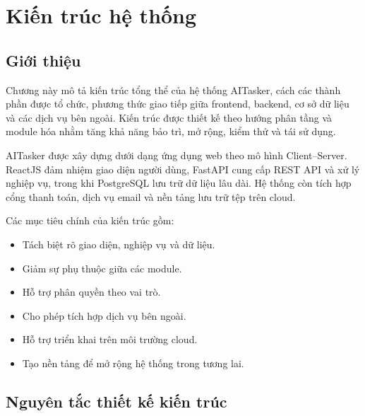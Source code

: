 %
%

\chapter{Kiến trúc hệ thống}
\label{chap:system-architecture}

\section{Giới thiệu}
\label{sec:architecture-introduction}

Chương này mô tả kiến trúc tổng thể của hệ thống AITasker, cách các thành phần được tổ chức, phương thức giao tiếp giữa frontend, backend, cơ sở dữ liệu và các dịch vụ bên ngoài. Kiến trúc được thiết kế theo hướng phân tầng và module hóa nhằm tăng khả năng bảo trì, mở rộng, kiểm thử và tái sử dụng.

AITasker được xây dựng dưới dạng ứng dụng web theo mô hình Client--Server. ReactJS đảm nhiệm giao diện người dùng, FastAPI cung cấp REST API và xử lý nghiệp vụ, trong khi PostgreSQL lưu trữ dữ liệu lâu dài. Hệ thống còn tích hợp cổng thanh toán, dịch vụ email và nền tảng lưu trữ tệp trên cloud.

Các mục tiêu chính của kiến trúc gồm:

\begin{itemize}
    \item Tách biệt rõ giao diện, nghiệp vụ và dữ liệu.
    \item Giảm sự phụ thuộc giữa các module.
    \item Hỗ trợ phân quyền theo vai trò.
    \item Cho phép tích hợp dịch vụ bên ngoài.
    \item Hỗ trợ triển khai trên môi trường cloud.
    \item Tạo nền tảng để mở rộng hệ thống trong tương lai.
\end{itemize}

\section{Nguyên tắc thiết kế kiến trúc}
\label{sec:architecture-principles}

